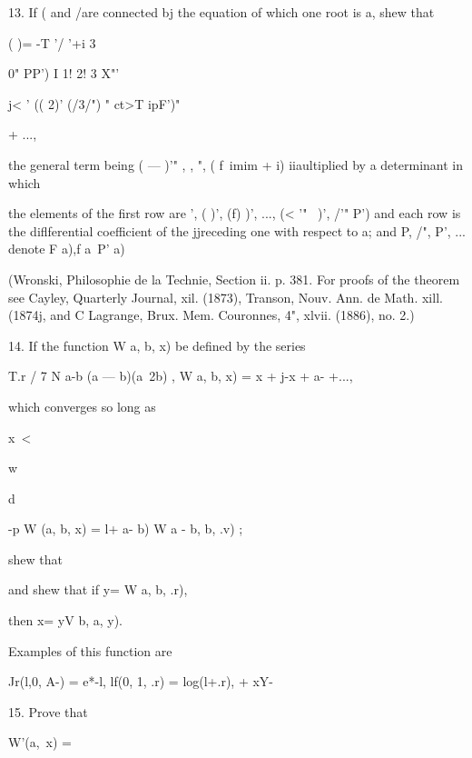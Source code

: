 {{13. If (  and /are connected bj the equation 
of which one root is a, shew that 



 (   )= -T '/ '+i 3 



0"  PP') I 1! 2! 3 
X"' 



j< ' (( 2)' (/3/") 
 "  ct>T ipF')" 



+ ..., 



the general term being ( — )'" , , ", ( f\ imim + i) iiaultiplied by a determinant in which 

the elements of the first row are  ',  ( )',  (f) )', ..., (< '"~ )',  /'"  P') and each row is the 
diflferential coefficient of the jjreceding one with respect to a; and P, /", P', ... denote 
F a),f a\ P' a) 

(Wronski, Philosophie de la Technie, Section ii. p. 381. For proofs of the theorem 
see Cayley, Quarterly Journal, xil. (1873), Transon, Nouv. Ann. de Math. xill. (1874j, and 
C Lagrange, Brux. Mem. Couronnes, 4", xlvii. (1886), no. 2.) 

14. If the function W a, b, x) be defined by the series 

T.r / 7 N a-b   (a — b)(a~2b) , 
W a, b, x) = x +  j-x  +   a- +..., 



which converges so long as 



x\ <  



w 



d 



-p W (a, b, x) = l+ a- b) W  a - b, b, .v) ; 



shew that 

and shew that if y= W  a, b, .r), 

then x= yV  b, a, y). 

Examples of this function are 

Jr(l,0, A-) = e*-l, 
lf(0, 1, .r) = log(l+.r), 
  + xY-\ 



15. Prove that 



W'(a, \,x) = 



}}
